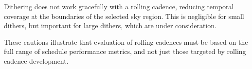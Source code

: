 Dithering does not work gracefully with a rolling cadence, reducing temporal coverage at the boundaries of the selected sky region.  This is negligible for small dithers, but important for large dithers, which are under consideration.

These cautions illustrate that evaluation of rolling cadences must be based on the full range of schedule performance metrics, and not just those targeted by rolling cadence development.


% 
% 
% 
